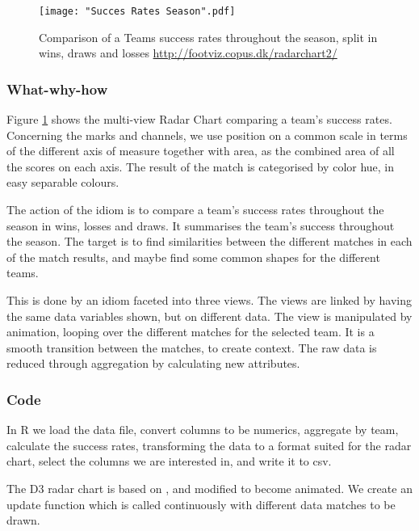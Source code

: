 \documentclass[Report.tex]{subfiles}
\begin{document}
\begin{figure}
\center
\texttt{[image: "Succes Rates Season".pdf]}
\caption{Comparison of a Teams success rates throughout the season, split in wins, draws and losses \url{http://footviz.copus.dk/radarchart2/}}
\label{Fig:CC}
\end{figure}


\subsubsection{What-why-how}
Figure \ref{Fig:CC} shows the multi-view Radar Chart comparing a team's success rates. Concerning the marks and channels, we use position on a common scale in terms of the different axis of measure together with area, as the combined area of all the scores on each axis. The result of the match is categorised by color hue, in easy separable colours.  

The action of the idiom is to compare a team's success rates throughout the season in wins, losses and draws. It summarises the team's success throughout the season.
The target is to find similarities between the different matches in each of the match results, and maybe find some common shapes for the different teams.

This is done by an idiom faceted into three views. The views are linked by having the same data variables shown, but on different data. The view is manipulated by animation, looping over the different matches for the selected team. It is a smooth transition between the matches, to create context. The raw data is reduced through aggregation by calculating new attributes.

\subsubsection{Code}
In R we load the data file, convert columns to be numerics, aggregate by team, calculate the success rates, transforming the data to a format suited for the radar chart, select the columns we are interested in, and write it to csv.

The D3 radar chart is based on \cite{Radar}, and modified to become animated. We create an update function which is called continuously with different data matches to be drawn. 
\end{document}
